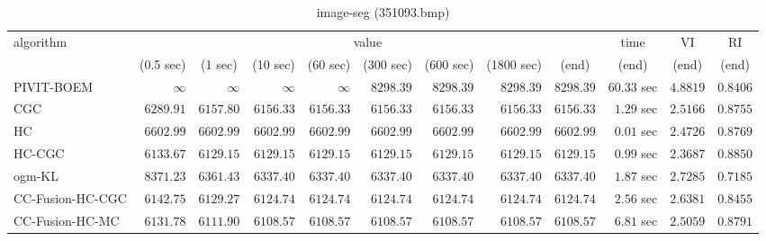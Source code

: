 \begin{table}[H]
\scriptsize
\centering
\caption{image-seg (351093.bmp)}
\label{tab:anytimetable-image-seg-351093.bmp}
\begin{tabular}{lrrrrrrrrrrr}
\toprule
           algorithm &                                   \multicolumn{8}{c}{value} & \multicolumn{1}{c}{time}    & \multicolumn{1}{c}{VI}  & \multicolumn{1}{c}{RI} \\  
\cmidrule(lr){2-9}\cmidrule(lr){10-10} \cmidrule(lr){11-11} \cmidrule(lr){12-12}   
                     & \multicolumn{1}{c}{(0.5 sec)} & \multicolumn{1}{c}{(1 sec)} & \multicolumn{1}{c}{(10 sec)} & \multicolumn{1}{c}{(60 sec)} & \multicolumn{1}{c}{(300 sec)} & \multicolumn{1}{c}{(600 sec)} & \multicolumn{1}{c}{(1800 sec)} & \multicolumn{1}{c}{(end)} & \multicolumn{1}{c}{(end)}    & \multicolumn{1}{c}{(end)}   & \multicolumn{1}{c}{(end)}  \\ \midrule 
          PIVIT-BOEM & $\infty$ & $\infty$ & $\infty$ & $\infty$ & $      8298.39$ & $      8298.39$ & $      8298.39$ & $      8298.39$ & $        60.33$ sec    & $       4.8819$  & $       0.8406$ \\ 
                 CGC & $      6289.91$ & $      6157.80$ & $      6156.33$ & $      6156.33$ & $      6156.33$ & $      6156.33$ & $      6156.33$ & $      6156.33$ & $         1.29$ sec    & $       2.5166$  & $       0.8755$ \\ 
                  HC & $      6602.99$ & $      6602.99$ & $      6602.99$ & $      6602.99$ & $      6602.99$ & $      6602.99$ & $      6602.99$ & $      6602.99$ & $         0.01$ sec    & $       2.4726$  & $       0.8769$ \\ 
              HC-CGC & $      6133.67$ & $      6129.15$ & $      6129.15$ & $      6129.15$ & $      6129.15$ & $      6129.15$ & $      6129.15$ & $      6129.15$ & $         0.99$ sec    & $       2.3687$  & $       0.8850$ \\ 
              ogm-KL & $      8371.23$ & $      6361.43$ & $      6337.40$ & $      6337.40$ & $      6337.40$ & $      6337.40$ & $      6337.40$ & $      6337.40$ & $         1.87$ sec    & $       2.7285$  & $       0.7185$ \\ 
    CC-Fusion-HC-CGC & $      6142.75$ & $      6129.27$ & $      6124.74$ & $      6124.74$ & $      6124.74$ & $      6124.74$ & $      6124.74$ & $      6124.74$ & $         2.56$ sec    & $       2.6381$  & $       0.8455$ \\ 
     CC-Fusion-HC-MC & $      6131.78$ & $      6111.90$ & $      6108.57$ & $      6108.57$ & $      6108.57$ & $      6108.57$ & $      6108.57$ & $      6108.57$ & $         6.81$ sec    & $       2.5059$  & $       0.8791$ \\ 

\end{tabular}
\end{table}
